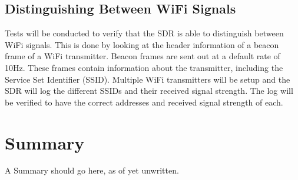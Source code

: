 \subsection{Distinguishing Between WiFi Signals}
Tests will be conducted to verify that the SDR is able to distinguish between WiFi signals. This is done by looking at the header information of a beacon frame of a WiFi transmitter. Beacon frames are sent out at a default rate of 10Hz. These frames contain information about the transmitter, including the Service Set Identifier (SSID). Multiple WiFi transmitters will be setup and the SDR will log the different SSIDs and their received signal strength. The log will be verified to have the correct addresses and received signal strength of each. 

\section{Summary}
A Summary should go here, as of yet unwritten.